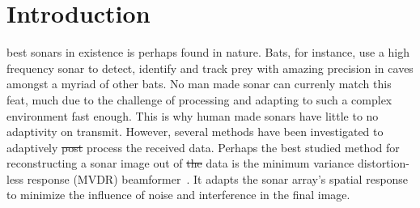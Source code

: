 \documentclass[10pt,journal,draftclsnofoot,onecolumn]{IEEEtran}
\newcommand\1{\vec 1}
\providecommand{\DIFadd}[1]{{\protect\color{blue}\uwave{#1}}} %
\providecommand{\DIFdel}[1]{{\protect\color{red}\sout{#1}}}                      %
\providecommand{\DIFaddbegin}{} %
\providecommand{\DIFaddend}{} %
\providecommand{\DIFdelbegin}{} %
\providecommand{\DIFdelend}{} %
\begin{document}
\maketitle

\IEEEdisplaynotcompsoctitleabstractindextext


\IEEEpeerreviewmaketitle

\section{Introduction}


% 
% 
% 
% 
% 
% 
% 

% 
% 
% 
% 
% 
% 
% 
% 
% 
% 

 best sonars in existence is perhaps found in nature. Bats, for instance, use a high frequency sonar to detect, identify and track prey with amazing precision in caves amongst a myriad of other bats. No man made sonar can currenly match this feat, much due to the challenge of processing and adapting to such a complex environment fast enough. This is why human made sonars have little to no adaptivity on transmit. However, several methods have been investigated to adaptively \DIFdelbegin \DIFdel{post }\DIFdelend process the received \DIFaddbegin \DIFadd{acustic }\DIFaddend data. Perhaps the best studied method for reconstructing a sonar image out of \DIFdelbegin \DIFdel{the }\DIFdelend \DIFaddbegin \DIFadd{such }\DIFaddend data is the minimum variance distortion-less response (MVDR) beamformer~\cite{Capon1969}. It adapts the sonar array's spatial response to minimize the influence of noise and interference in the final image.
\end{document}
